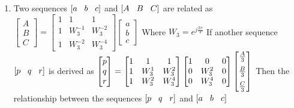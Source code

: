 \documentclass[journal,12pt,twocolumn]{IEEEtran}
\begin{document}
\begin{enumerate}
\item Two sequences $[a\hspace{3mm}b\hspace{3mm}c]$ and $[A \hspace{3mm}B \hspace{3mm}C]$ are related as  \newline $\begin{bmatrix}
A\\
B \\
C
\end{bmatrix}=\begin{bmatrix}
1 & 1 & 1\\
1 & W^{-1}_3 & W^{-2}_3 \\
1 & W^{-2}_3 & W^{-4}_3
\end{bmatrix}\begin{bmatrix}
a\\
b \\
c
\end{bmatrix} $ Where $W_3=e^{j\frac{2\pi}{3}}$ \newline If another sequence $[p\hspace{3mm}q\hspace{3mm}r]$ is derived as \newline
$\begin{bmatrix}
p\\
q \\
r
\end{bmatrix}=\begin{bmatrix}
1 & 1 & 1\\
1 & W^{1}_3 & W^{2}_3 \\
1 & W^{2}_3 & W^{4}_3
\end{bmatrix} \begin{bmatrix}
1 & 0 & 0\\
0 & W^{2}_3 & 0 \\
0 & W^{4}_3 & 0
\end{bmatrix}\begin{bmatrix}
\frac{A}{3} \vspace{2mm}\\
\frac{B}{3} \vspace{2mm}\\
\frac{C}{3}
\end{bmatrix} $ 
\newline Then the relationship between the sequences $[p\hspace{3mm}q\hspace{3mm}r]$ and $[a\hspace{3mm}b\hspace{3mm}c]$\\
\setlength\itemsep{2em}
\begin{enumerate}



\end{enumerate}
\end{enumerate}
\end{document}
